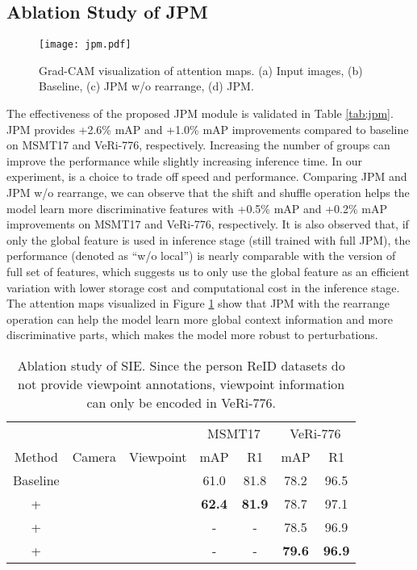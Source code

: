 \documentclass[10pt,twocolumn,letterpaper]{article}
\begin{document}
\subsection{Ablation Study of JPM}

\begin{figure}[t]
    \centering
	\texttt{[image: jpm.pdf]}
	\vspace{-1.5em}
	\caption{Grad-CAM visualization of attention maps. (a) Input images, (b) Baseline, (c) JPM w/o rearrange, (d) JPM.} 
	\vspace{-1.em}
	\label{fig:jpm}
\end{figure}

The effectiveness of the proposed JPM module is validated in Table \ref{tab:jpm}. JPM provides +2.6\% mAP and +1.0\% mAP improvements compared to baseline on MSMT17 and VeRi-776, respectively. Increasing the number of groups  can improve the performance while slightly increasing inference time. In our experiment,  is a choice to trade off speed and performance. Comparing JPM and JPM w/o rearrange, we can observe that the shift and shuffle operation helps the model learn more discriminative features with +0.5\% mAP and +0.2\% mAP improvements on MSMT17 and VeRi-776, respectively. It is also observed that, if only the global feature  is used in inference stage (still trained with full JPM), the performance (denoted as  ``w/o local'') is nearly comparable with the version of full set of features, which suggests us to only use the global feature as an efficient variation with  lower storage cost and computational cost in the inference stage. The attention maps visualized in Figure \ref{fig:jpm} show that JPM with the rearrange operation can help the model learn more global context information and more discriminative parts, which makes the model more robust to perturbations.

\renewcommand{\multirowsetup}{\centering}
\begin{table}[tb]
\footnotesize
    \begin{center}
    \begin{tabular}{ c|cc|cc|cc}
    \hline
    & \multicolumn{2}{c|}{} & \multicolumn{2}{c|}{MSMT17} & \multicolumn{2}{c}{VeRi-776} \\
    Method & Camera    & Viewpoint  & mAP    & R1  & mAP & R1  \\
    \hline
    \hline
    Baseline&  &        & 61.0  & 81.8  & 78.2  & 96.5\\
    + &  & & \textbf{62.4}  & \textbf{81.9}  & 78.7&97.1\\
    + &  & & -     & -     &78.5&96.9\\
    +  &  &  & - & - &\textbf{79.6} & \textbf{96.9}\\
\hline
    \end{tabular}
    \end{center}
    \vspace{-0.5em}
    \caption{\label{tab:SIE} Ablation study of SIE. Since the person ReID datasets do not provide viewpoint annotations, viewpoint information can only be encoded in VeRi-776.}
    \vspace{-0.5em}
\end{table}
\end{document}
